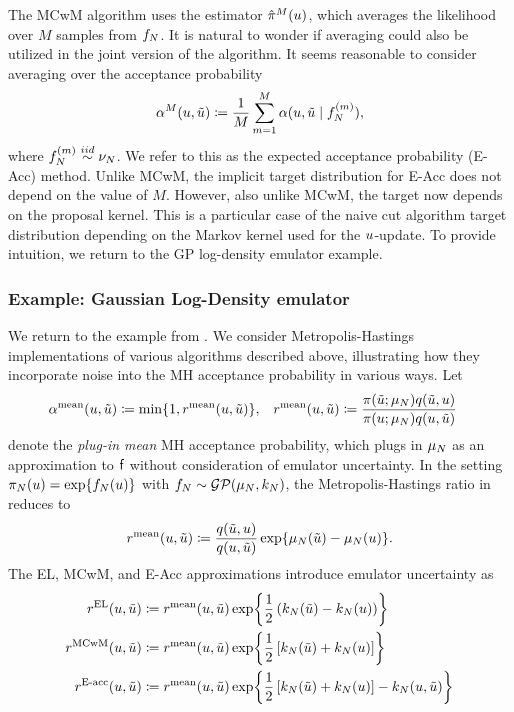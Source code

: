 \documentclass[12pt]{article}
\begin{document}
The MCwM algorithm uses the estimator $\hat{\pi}^M(u)$, which averages the likelihood over $M$
samples from $f_{N}$. It is natural to wonder if averaging could also be utilized in the joint version of the 
algorithm. It seems reasonable to consider averaging over the acceptance probability
\begin{equation}
\alpha^M(u, \tilde{u}) \coloneqq \frac{1}{M} \sum_{m=1}^{M} \alpha(u, \tilde{u} \mid f_{N}^{(m)}),
\end{equation}
where $f_{N}^{(m)} \overset{iid}{\sim} \nu_{N}$. We refer to this as the expected acceptance probability (E-Acc) method.
Unlike MCwM, the implicit target distribution for E-Acc does not depend on the value of $M$. However, also unlike MCwM, the 
target now depends on the proposal kernel. This is a particular case of the naive cut algorithm target distribution
depending on the Markov kernel used for the $u$-update. To provide intuition, we return to the GP log-density emulator example.
 
\subsubsection{Example: Gaussian Log-Density emulator}
We return to the example from . We consider Metropolis-Hastings 
implementations of various algorithms described above, illustrating how they incorporate noise
into the MH acceptance probability in various ways.  
Let 
\begin{align}
&\alpha^{\mathrm{mean}}(u, \tilde{u}) \coloneqq
\min\{1, r^{\mathrm{mean}}(u, \tilde{u})\},
&&r^{\mathrm{mean}}(u, \tilde{u}) \coloneqq 
\frac{\pi(\tilde{u}; \mu_{N}) q(\tilde{u}, u)}{\pi(u; \mu_{N}) q(u, \tilde{u})}
\label{eq:acc-prob-mean}
\end{align}
denote the \textit{plug-in mean} MH acceptance probability, which plugs in $\mu_{N}$ as an approximation 
to $\mathsf{f}$ without consideration of emulator uncertainty. In the setting $\pi_{N}(u) = \exp\mathopen{}\left\{f_{N}(u)\right\}\mathclose{}$
with $f_{N} \sim \mathcal{GP}(\mu_{N}, k_{N})$, the Metropolis-Hastings ratio in  reduces to
\begin{equation}
r^{\mathrm{mean}}(u, \tilde{u}) \coloneqq 
\frac{q(\tilde{u}, u)}{q(u, \tilde{u})}
\exp\mathopen{}\left\{\mu_{N}(\tilde{u}) - \mu_{N}(u)\right\}\mathclose{}. 
\end{equation}
The EL, MCwM, and E-Acc approximations introduce emulator uncertainty as
\begin{align}
r^{\mathrm{EL}}(u, \tilde{u}) &\coloneqq 
r^{\mathrm{mean}}(u, \tilde{u}) \exp\mathopen{}\left\{\frac{1}{2}\left(k_{N}(\tilde{u}) - k_{N}(u) \right)\right\}\mathclose{} \\
r^{\mathrm{MCwM}}(u, \tilde{u}) &\coloneqq 
r^{\mathrm{mean}}(u, \tilde{u}) \exp\mathopen{}\left\{\frac{1}{2}\left[k_{N}(\tilde{u}) + k_{N}(u) \right]\right\}\mathclose{} \\
r^{\textrm{E-acc}}(u, \tilde{u}) &\coloneqq 
r^{\mathrm{mean}}(u, \tilde{u}) \exp\mathopen{}\left\{\frac{1}{2}\left[k_{N}(\tilde{u}) + k_{N}(u) \right] - k_{N}(u, \tilde{u})\right\}\mathclose{} 
\end{align}
\end{document}
